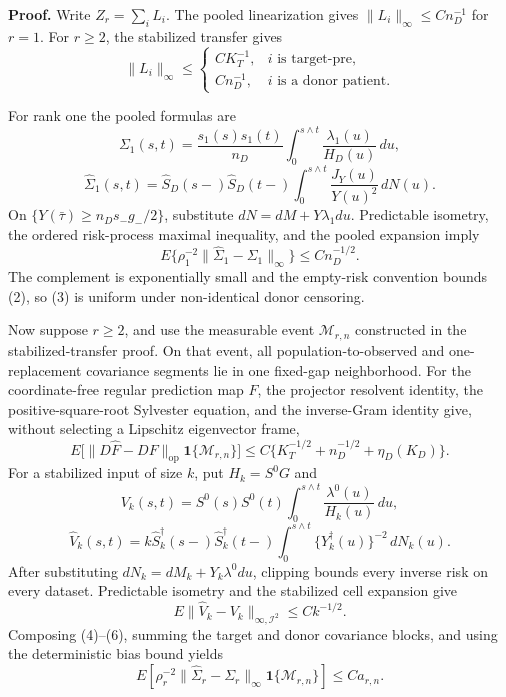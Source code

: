 \textbf{Proof.}
Write \(Z_r=\sum_iL_i\).  The pooled linearization gives \(\|L_i\|_\infty\le Cn_D^{-1}\) for \(r=1\).  For \(r\ge2\), the stabilized transfer gives
\[
 \|L_i\|_\infty\le
 \begin{cases}
 CK_T^{-1},&i\text{ is target-pre},\\
 Cn_D^{-1},&i\text{ is a donor patient}.
 \end{cases}                                             \tag{1}
\]

For rank one the pooled formulas are
\[
 \Sigma_1(s,t)=\frac{s_1(s)s_1(t)}{n_D}
 \int_0^{s\wedge t}\frac{\lambda_1(u)}{H_D(u)}\,du,
\]
\[
 \widehat\Sigma_1(s,t)=\widehat S_D(s-)\widehat S_D(t-)
 \int_0^{s\wedge t}\frac{J_Y(u)}{Y(u)^2}\,dN(u).       \tag{2}
\]
On \(\{Y(\bar\tau)\ge n_Ds_-g_-/2\}\), substitute \(dN=dM+Y\lambda_1du\).  Predictable isometry, the ordered risk-process maximal inequality, and the pooled expansion imply
\[
 E\{\rho_1^{-2}\|\widehat\Sigma_1-\Sigma_1\|_\infty\}
 \le Cn_D^{-1/2}.                                       \tag{3}
\]
The complement is exponentially small and the empty-risk convention bounds (2), so (3) is uniform under non-identical donor censoring.

Now suppose \(r\ge2\), and use the measurable event \(\mathcal M_{r,n}\) constructed in the stabilized-transfer proof.  On that event, all population-to-observed and one-replacement covariance segments lie in one fixed-gap neighborhood.  For the coordinate-free regular prediction map \(F\), the projector resolvent identity, the positive-square-root Sylvester equation, and the inverse-Gram identity give, without selecting a Lipschitz eigenvector frame,
\[
 E\bigl[\|D\widehat F-DF\|_{\mathrm{op}}
 \mathbf1\{\mathcal M_{r,n}\}\bigr]
 \le C\{K_T^{-1/2}+n_D^{-1/2}+\eta_D(K_D)\}.           \tag{4}
\]
For a stabilized input of size \(k\), put \(H_k=S^0G\) and
\[
 V_k(s,t)=S^0(s)S^0(t)\int_0^{s\wedge t}
 \frac{\lambda^0(u)}{H_k(u)}\,du,
\]
\[
 \widehat V_k(s,t)=k\widehat S_k^\dagger(s-)
 \widehat S_k^\dagger(t-)
 \int_0^{s\wedge t}\{Y_k^\dagger(u)\}^{-2}\,dN_k(u). \tag{5}
\]
After substituting \(dN_k=dM_k+Y_k\lambda^0du\), clipping bounds every inverse risk on every dataset.  Predictable isometry and the stabilized cell expansion give
\[
 E\|\widehat V_k-V_k\|_{\infty,\mathcal I^2}\le Ck^{-1/2}. \tag{6}
\]
Composing (4)--(6), summing the target and donor covariance blocks, and using the deterministic bias bound yields
\[
 E\left[\rho_r^{-2}
 \|\widehat\Sigma_r-\Sigma_r\|_\infty
 \mathbf1\{\mathcal M_{r,n}\}\right]
 \le Ca_{r,n}.                                          \tag{7}
\]

